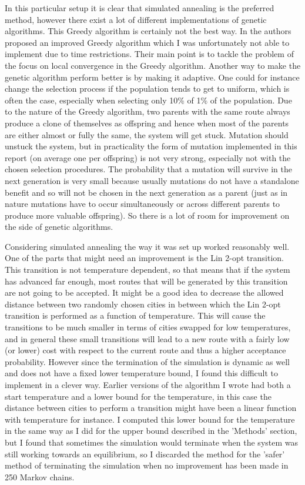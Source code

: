 \documentclass[10pt,a4paper]{article}
\begin{document}
In this particular setup it is clear that simulated annealing is the preferred method, however there exist a lot of different implementations of genetic algorithms. This Greedy algorithm is certainly not the best way. In \cite{Greedy} the authors proposed an improved Greedy algorithm which I was unfortunately not able to implement due to time restrictions. Their main point is to tackle the problem of the focus on local convergence in the Greedy algorithm. Another way to make the genetic algorithm perform better is by making it adaptive. One could for instance change the selection process if the population tends to get to uniform, which is often the case, especially when selecting only 10\% of 1\% of the population. Due to the nature of the Greedy algorithm, two parents with the same route always produce a clone of themselves as offspring and hence when most of the parents are either almost or fully the same, the system will get stuck. Mutation should unstuck the system, but in practicality the form of mutation implemented in this report (on average one per offspring) is not very strong, especially not with the chosen selection procedures. The probability that a mutation will survive in the next generation is very small because usually mutations do not have a standalone benefit and so will not be chosen in the next generation as a parent (just as in nature mutations have to occur simultaneously or across different parents to produce more valuable offspring). So there is a lot of room for improvement on the side of genetic algorithms.

Considering simulated annealing the way it was set up worked reasonably well. One of the parts that might need an improvement is the Lin 2-opt transition. This transition is not temperature dependent, so that means that if the system has advanced far enough, most routes that will be generated by this transition are not going to be accepted. It might be a good idea to decrease the allowed distance between two randomly chosen cities in between which the Lin 2-opt transition is performed as a function of temperature. This will cause the transitions to be much smaller in terms of cities swapped for low temperatures, and in general these small transitions will lead to a new route with a fairly low (or lower) cost with respect to the current route and thus a higher acceptance probability. However since the termination of the simulation is dynamic as well and does not have a fixed lower temperature bound, I found this difficult to implement in a clever way. Earlier versions of the algorithm I wrote had both a start temperature and a lower bound for the temperature, in this case the distance between cities to perform a transition might have been a linear function with temperature for instance. I computed this lower  bound for the temperature in the same way as I did for the upper bound described in the 'Methods' section, but I found that sometimes the simulation would terminate when the system was still working towards an equilibrium, so I discarded the method for the 'safer' method of terminating the simulation when no improvement has been made in 250 Markov chains.
\end{document}
